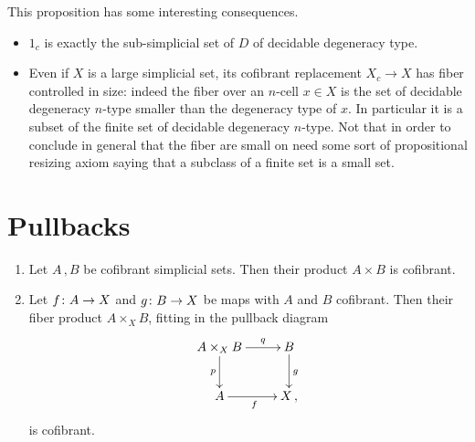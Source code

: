 \documentclass[reqno,10pt,a4paper,oneside,draft]{amsart}
\begin{document}
\begin{remark} 
This proposition has some interesting consequences.
\begin{itemize}
\item $1_c$ is exactly the sub-simplicial set of $D$ of decidable degeneracy type.
\item Even if $X$ is a large simplicial set, its cofibrant replacement $X_c \rightarrow X$ has fiber controlled in size: indeed the fiber over an $n$-cell $x \in X$ is the set of decidable degeneracy $n$-type smaller than the degeneracy type of $x$. In particular it is a subset of the finite set of decidable degeneracy $n$-type. Not that in order to conclude in general that the fiber are small on need some sort of propositional resizing axiom saying that a subclass of a finite set is a small set.
\end{itemize}
\end{remark}



 

\section{Pullbacks} 





 












\begin{proposition}\label{lem:cofibrant_fiber_product} \hfill 
\begin{enumerate}[$(i)$] 
\item Let $A \, , B$ be cofibrant simplicial sets. Then their product $A \times B$ is cofibrant.
\item Let $f \colon A \to X$ and $g \colon B \to X$ be maps with $A$ and $B$ cofibrant. Then their
fiber product $A \times_X B$, fitting in the pullback diagram
\[
\xymatrix{
A \times_X B \ar[r]^-{q} \ar[d]_-{p} & B \ar[d]^g \\
A \ar[r]_f & X \, ,}
\]
is cofibrant.
\end{enumerate}
\end{proposition}
\end{document}
